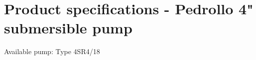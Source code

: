 \chapter{Product specifications - Pedrollo 4" submersible pump}
\label{chapter:Pedrollo_product_specs}

Available pump: Type 4SR4/18

